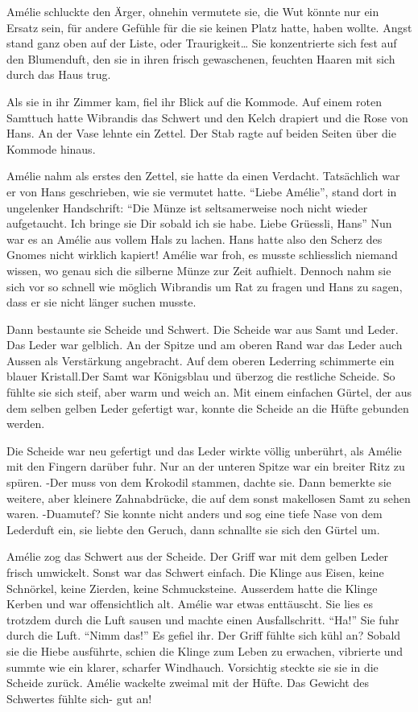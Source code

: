 \documentclass[11pt,titlepage,a5paper]{book}
\begin{document}
Amélie schluckte den Ärger, ohnehin vermutete sie, die Wut könnte nur ein Ersatz sein, für andere Gefühle für die sie keinen Platz hatte, haben wollte. Angst stand ganz oben auf der Liste, oder Traurigkeit\dots
Sie konzentrierte sich fest auf den Blumenduft, den sie in ihren frisch gewaschenen, feuchten Haaren mit sich durch das Haus trug. 

Als sie in ihr Zimmer kam, fiel ihr Blick auf die Kommode. Auf einem roten Samttuch hatte Wibrandis das Schwert und den Kelch drapiert und die Rose von Hans. An der Vase lehnte ein Zettel. Der Stab ragte auf beiden Seiten über die Kommode hinaus.

Amélie nahm als erstes den Zettel, sie hatte da einen Verdacht. Tatsächlich war er von Hans geschrieben, wie sie vermutet hatte. "`Liebe Amélie"', stand dort in ungelenker Handschrift: "`Die Münze ist seltsamerweise noch nicht wieder aufgetaucht. Ich bringe sie Dir sobald ich sie habe. Liebe Grüessli, Hans"' Nun war es an Amélie aus vollem Hals zu lachen. Hans hatte also den Scherz des Gnomes nicht wirklich kapiert! Amélie war froh, es musste schliesslich niemand wissen, wo genau sich die silberne Münze zur Zeit aufhielt. Dennoch nahm sie sich vor so schnell wie möglich Wibrandis um Rat zu fragen und Hans zu sagen, dass er sie nicht länger suchen musste.

Dann bestaunte sie Scheide und Schwert. Die Scheide war aus Samt und Leder. Das Leder war gelblich. An der Spitze und am oberen Rand war das Leder auch Aussen als Verstärkung angebracht. Auf dem oberen Lederring schimmerte ein blauer Kristall.Der Samt war Königsblau und überzog die restliche Scheide. So fühlte sie sich steif, aber warm und weich an. Mit einem einfachen Gürtel, der aus dem selben gelben Leder gefertigt war, konnte die Scheide an die Hüfte gebunden werden. 

Die Scheide war neu gefertigt und das Leder wirkte völlig unberührt, als Amélie mit den Fingern darüber fuhr. Nur an der unteren Spitze war ein breiter Ritz zu spüren. -Der muss von dem Krokodil stammen, dachte sie. Dann bemerkte sie weitere, aber kleinere Zahnabdrücke, die auf dem sonst makellosen Samt zu sehen waren. -Duamutef? Sie konnte nicht anders und sog eine tiefe Nase von dem Lederduft ein, sie liebte den Geruch, dann schnallte sie sich den Gürtel um.

Amélie zog das Schwert aus der Scheide. Der Griff war mit dem gelben Leder frisch umwickelt. Sonst war das Schwert einfach. Die Klinge aus Eisen, keine Schnörkel, keine Zierden, keine Schmucksteine. Ausserdem hatte die Klinge Kerben und war offensichtlich alt. Amélie war etwas enttäuscht. Sie lies es trotzdem durch die Luft sausen und machte einen Ausfallschritt. "`Ha!"' Sie fuhr durch die Luft. "`Nimm das!"' Es gefiel ihr. Der Griff fühlte sich kühl an? Sobald sie die Hiebe ausführte, schien die Klinge zum Leben zu erwachen, vibrierte und summte wie ein klarer, scharfer Windhauch. Vorsichtig steckte sie sie in die Scheide zurück. Amélie wackelte zweimal mit der Hüfte. Das Gewicht des Schwertes fühlte sich- gut an!
\end{document}
